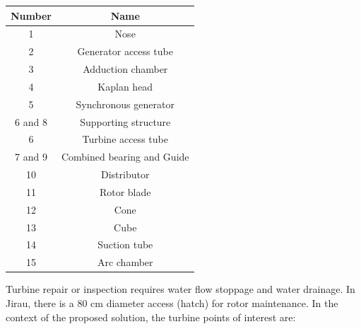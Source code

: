 \begin{center}
\begin{tabular}{  c | c  }
  \hline
  \textbf{Number} & \textbf{Name} \\ \hline
  1 & Nose \\ \hline
  2 & Generator access tube  \\ \hline
  3 & Adduction chamber  \\ \hline
  4 & Kaplan head  \\ \hline
  5 & Synchronous generator  \\ \hline
  6 and 8 & Supporting structure \\ \hline
  6 & Turbine access tube \\ \hline
  7 and 9 & Combined bearing and Guide \\ \hline
  10 & Distributor \\ \hline
  11 & Rotor blade \\ \hline
  12 & Cone \\ \hline
  13 & Cube \\ \hline
  14 & Suction tube \\ \hline
  15 & Arc chamber \\
  \hline
\end{tabular}
\label{tab::bulb_turbine}
\end{center}

Turbine repair or inspection requires water flow stoppage and water drainage. In
Jirau, there is a 80 cm diameter access (hatch) for rotor maintenance. In the
context of the proposed solution, the turbine points of interest are:


